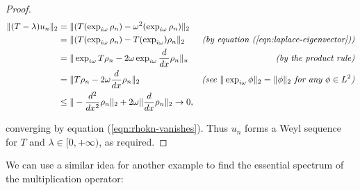 \documentclass[../main.tex]{subfiles}
\begin{document}
\begin{proof}
\begin{align*}
\|(T - \lambda)u_n\|_2 & = \|(T(\exp_{i \omega} \rho_n) - \omega^2(\exp_{i \omega} \rho_n)\|_2 & \\
& = \|(T(\exp_{i \omega} \rho_n) - T(\exp_{i \omega}) \rho_n\|_2 
  & \text{\emph{(by equation (\ref{eqn:laplace-eigenvector}))}} \\
& =\|\exp_{i \omega} T\rho_n - 2 \omega \exp_{i \omega} \frac{d}{dx}\rho_n\|_u 
  & \text{\emph{(by the product rule)}} \\
& = \|T\rho_n - 2 \omega \frac{d}{dx}\rho_n\|_2 
  & \text{\emph{(see $\|\exp_{i \omega} \phi\|_2 = \|\phi\|_2$ for any $\phi \in L^2$)}} \\
& \leq  \|-\frac{d^2}{dx^2}\rho_n\|_2 + 2\omega\|\frac{d}{dx}\rho_n\|_2 \rightarrow 0, & 
\end{align*}

converging by equation (\ref{eqn:rhokn-vanishes}).
Thus $u_n$ forms a Weyl sequence for $T$ and $\lambda \in [0, +\infty)$, as
required. 
\end{proof}

We can use a similar idea for another example to find the essential spectrum of
the multiplication operator:
\end{document}

